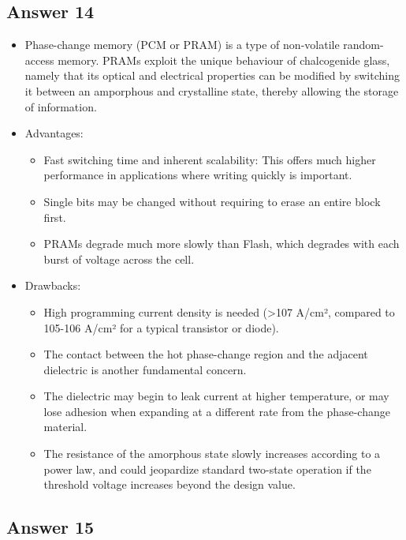 \documentclass[]{article}
\begin{document}
\subsection{Answer 14}\label{answer-14}

\begin{itemize}
\itemsep1pt\parskip0pt
\item
  Phase-change memory (PCM or PRAM) is a type of non-volatile
  random-access memory. PRAMs exploit the unique behaviour of
  chalcogenide glass, namely that its optical and electrical properties
  can be modified by switching it between an amporphous and crystalline
  state, thereby allowing the storage of information.
\item
  Advantages:

  \begin{itemize}
  \itemsep1pt\parskip0pt
  \item
    Fast switching time and inherent scalability: This offers much
    higher performance in applications where writing quickly is
    important.
  \item
    Single bits may be changed without requiring to erase an entire
    block first.
  \item
    PRAMs degrade much more slowly than Flash, which degrades with each
    burst of voltage across the cell.
  \end{itemize}
\item
  Drawbacks:

  \begin{itemize}
  \itemsep1pt\parskip0pt
  \item
    High programming current density is needed (\textgreater{}107 A/cm²,
    compared to 105-106 A/cm² for a typical transistor or diode).
  \item
    The contact between the hot phase-change region and the adjacent
    dielectric is another fundamental concern.
  \item
    The dielectric may begin to leak current at higher temperature, or
    may lose adhesion when expanding at a different rate from the
    phase-change material.
  \item
    The resistance of the amorphous state slowly increases according to
    a power law, and could jeopardize standard two-state operation if
    the threshold voltage increases beyond the design value.
  \end{itemize}
\end{itemize}

\subsection{Answer 15}\label{answer-15}
\end{document}
